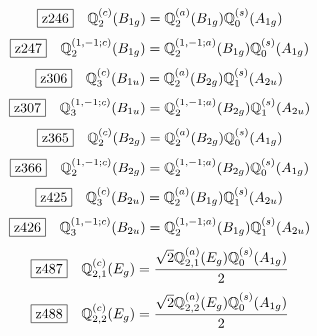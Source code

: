 \documentclass[fleqn,10pt,landscape]{jsarticle}
\begin{document}
\begin{dmath*}
\hspace*{3mm}\fbox{z246}\quad \mathbb{Q}_{2}^{(c)}(B_{1g})=\mathbb{Q}_{2}^{(a)}(B_{1g}) \mathbb{Q}_{0}^{(s)}(A_{1g})
\end{dmath*}
\begin{dmath*}
\hspace*{3mm}\fbox{z247}\quad \mathbb{Q}_{2}^{(1,-1;c)}(B_{1g})=\mathbb{Q}_{2}^{(1,-1;a)}(B_{1g}) \mathbb{Q}_{0}^{(s)}(A_{1g})
\end{dmath*}
\begin{dmath*}
\hspace*{3mm}\fbox{z306}\quad \mathbb{Q}_{3}^{(c)}(B_{1u})=\mathbb{Q}_{2}^{(a)}(B_{2g}) \mathbb{Q}_{1}^{(s)}(A_{2u})
\end{dmath*}
\begin{dmath*}
\hspace*{3mm}\fbox{z307}\quad \mathbb{Q}_{3}^{(1,-1;c)}(B_{1u})=\mathbb{Q}_{2}^{(1,-1;a)}(B_{2g}) \mathbb{Q}_{1}^{(s)}(A_{2u})
\end{dmath*}
\begin{dmath*}
\hspace*{3mm}\fbox{z365}\quad \mathbb{Q}_{2}^{(c)}(B_{2g})=\mathbb{Q}_{2}^{(a)}(B_{2g}) \mathbb{Q}_{0}^{(s)}(A_{1g})
\end{dmath*}
\begin{dmath*}
\hspace*{3mm}\fbox{z366}\quad \mathbb{Q}_{2}^{(1,-1;c)}(B_{2g})=\mathbb{Q}_{2}^{(1,-1;a)}(B_{2g}) \mathbb{Q}_{0}^{(s)}(A_{1g})
\end{dmath*}
\begin{dmath*}
\hspace*{3mm}\fbox{z425}\quad \mathbb{Q}_{3}^{(c)}(B_{2u})=\mathbb{Q}_{2}^{(a)}(B_{1g}) \mathbb{Q}_{1}^{(s)}(A_{2u})
\end{dmath*}
\begin{dmath*}
\hspace*{3mm}\fbox{z426}\quad \mathbb{Q}_{3}^{(1,-1;c)}(B_{2u})=\mathbb{Q}_{2}^{(1,-1;a)}(B_{1g}) \mathbb{Q}_{1}^{(s)}(A_{2u})
\end{dmath*}
\begin{dmath*}
\hspace*{3mm}\fbox{z487}\quad \mathbb{Q}_{2,1}^{(c)}(E_{g})=\frac{\sqrt{2} \mathbb{Q}_{2,1}^{(a)}(E_{g}) \mathbb{Q}_{0}^{(s)}(A_{1g})}{2}
\end{dmath*}
\begin{dmath*}
\hspace*{3mm}\fbox{z488}\quad \mathbb{Q}_{2,2}^{(c)}(E_{g})=\frac{\sqrt{2} \mathbb{Q}_{2,2}^{(a)}(E_{g}) \mathbb{Q}_{0}^{(s)}(A_{1g})}{2}
\end{dmath*}
\end{document}
